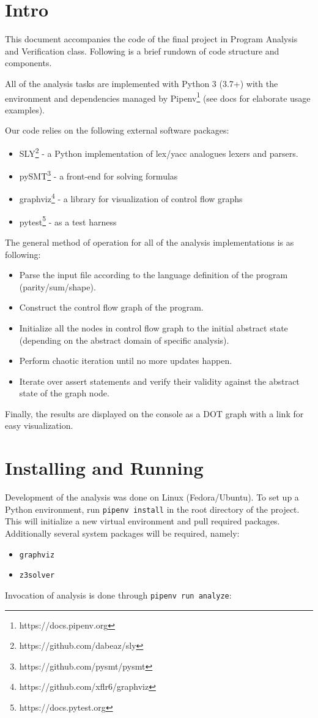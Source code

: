 \documentclass[12pt,a4paper]{article}
\begin{document}
	\section*{Intro}
	This document accompanies the code of the final project in Program Analysis and Verification class. Following is a brief rundown of code structure and components.
	
	All of the analysis tasks are implemented with Python 3 (3.7+) with the environment and dependencies managed by Pipenv\footnote{https://docs.pipenv.org} (see docs for elaborate usage examples).
	
	Our code relies on the following external software packages:
	\begin{itemize}
		\item SLY\footnote{https://github.com/dabeaz/sly} - a Python implementation of lex/yacc analogues lexers and parsers.
		\item pySMT\footnote{https://github.com/pysmt/pysmt} - a front-end for solving formulas
		\item graphviz\footnote{https://github.com/xflr6/graphviz} - a library for visualization of control flow graphs
		\item pytest\footnote{https://docs.pytest.org} - as a test harness
	\end{itemize}
The general method of operation for all of the analysis implementations is as following:
\begin{itemize}
	\item Parse the input file according to the language definition of the program (parity/sum/shape).
	\item Construct the control flow graph of the program.
	\item Initialize all the nodes in control flow graph to the initial abstract state (depending on the abstract domain of specific analysis).
	\item Perform chaotic iteration until no more updates happen.
	\item Iterate over assert statements and verify their validity against the abstract state of the graph node.
\end{itemize}
Finally, the results are displayed on the console as a DOT graph with a link for easy visualization.

\section*{Installing and Running}
Development of the analysis was done on Linux (Fedora/Ubuntu). To set up a Python environment, run \texttt{pipenv install} in the root directory of the project. This will initialize a new virtual environment and pull required packages. Additionally several system packages will be required, namely:
\begin{itemize}
	\item \texttt{graphviz}
	\item \texttt{z3solver}
\end{itemize}

Invocation of analysis is done through \texttt{pipenv run analyze}:




\end{document}
